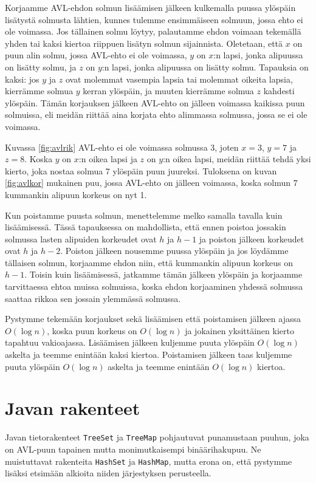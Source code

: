 Korjaamme AVL-ehdon solmun lisäämisen jälkeen
kulkemalla puussa ylös\-päin lisätystä solmusta lähtien,
kunnes tulemme ensimmäiseen solmuun, jossa ehto ei ole voimassa.
Jos tällainen solmu löytyy, palautamme ehdon voimaan tekemällä yhden
tai kaksi kiertoa riippuen lisätyn solmun sijainnista.
Oletetaan, että $x$ on puun alin solmu,
jossa AVL-ehto ei ole voimassa,
$y$ on $x$:n lapsi, jonka alipuussa on lisätty solmu,
ja $z$ on $y$:n lapsi, jonka alipuussa on lisätty solmu.
Tapauksia on kaksi: jos $y$ ja $z$ ovat molemmat
vasempia lapsia tai molemmat oikeita lapsia,
kierrämme solmua $y$ kerran ylöspäin,
ja muuten kierrämme solmua $z$ kahdesti ylöspäin.
Tämän korjauksen jälkeen AVL-ehto on jälleen
voimassa kaikissa puun solmuissa, eli meidän riittää aina
korjata ehto alimmassa solmussa, jossa se ei ole voimassa.

Kuvassa \ref{fig:avlrik} AVL-ehto ei ole voimassa solmussa $3$,
joten $x=3$, $y=7$ ja $z=8$.
Koska $y$ on $x$:n oikea lapsi ja $z$ on $y$:n oikea lapsi,
meidän riittää tehdä yksi kierto, joka nostaa solmua $7$ ylöspäin
puun juureksi.
Tuloksena on kuvan \ref{fig:avlkor} mukainen puu, jossa
AVL-ehto on jälleen voimassa,
koska solmun $7$ kummankin alipuun korkeus on nyt 1.

Kun poistamme puusta solmun, menettelemme melko samalla tavalla
kuin lisäämisessä.
Tässä tapauksessa on mahdollista, että ennen poistoa
jossakin solmussa lasten alipuiden korkeudet ovat $h$ ja $h-1$
ja poiston jälkeen korkeudet ovat $h$ ja $h-2$.
Poiston jälkeen nousemme puussa ylöspäin ja jos löydämme
tällaisen solmun, korjaamme ehdon niin, että kummankin alipuun
korkeus on $h-1$.
Toisin kuin lisäämisessä, jatkamme tämän jälkeen ylöspäin
ja korjaamme tarvittaessa ehtoa muissa solmuissa,
koska ehdon korjaaminen yhdessä solmussa saattaa rikkoa
sen jossain ylemmässä solmussa.

Pystymme tekemään korjaukset sekä lisäämisen että poistamisen
jälkeen ajassa $O(\log n)$,
koska puun korkeus on $O(\log n)$ ja jokainen yksittäinen
kierto tapahtuu vakioajassa.
Lisäämisen jälkeen kuljemme puuta ylöspäin $O(\log n)$ askelta
ja teemme enintään kaksi kiertoa.
Poistamisen jälkeen taas kuljemme puuta ylöspäin $O(\log n)$ askelta
ja teemme enintään $O(\log n)$ kiertoa.


\section{Javan rakenteet}

Javan tietorakenteet \texttt{TreeSet} ja \texttt{TreeMap}
pohjautuvat punamustaan puuhun,
joka on AVL-puun tapainen mutta monimutkaisempi
binäärihakupuu.
Ne muistuttavat rakenteita \texttt{HashSet} ja \texttt{HashMap},
mutta erona on, että pystymme lisäksi etsimään
alkioita niiden järjestyksen perusteella.

